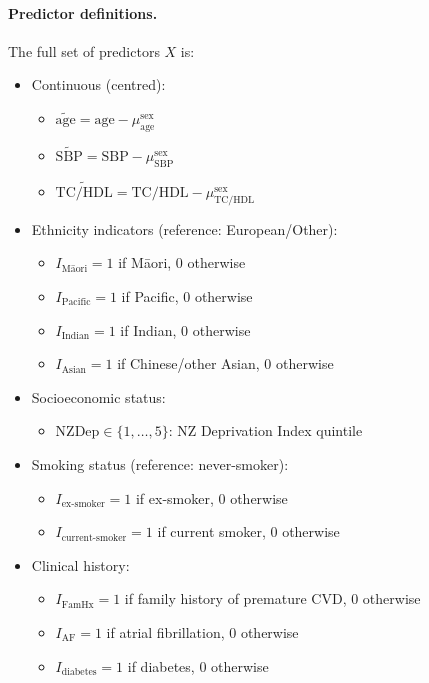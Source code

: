 \documentclass{article}
\begin{document}
\paragraph{Predictor definitions.}
The full set of predictors \(X\) is:
\begin{itemize}
  \item Continuous (centred):
    \begin{itemize}
      \item \(\tilde{\text{age}} = \text{age} - \mu_{\text{age}}^{\text{sex}}\)
      \item \(\widetilde{\text{SBP}} = \text{SBP} - \mu_{\text{SBP}}^{\text{sex}}\)
      \item \(\widetilde{\text{TC/HDL}} = \text{TC/HDL} - \mu_{\text{TC/HDL}}^{\text{sex}}\)
    \end{itemize}
  \item Ethnicity indicators (reference: European/Other):
    \begin{itemize}
      \item \(I_{\text{M\={a}ori}} = 1\) if M\={a}ori, 0 otherwise
      \item \(I_{\text{Pacific}} = 1\) if Pacific, 0 otherwise
      \item \(I_{\text{Indian}} = 1\) if Indian, 0 otherwise
      \item \(I_{\text{Asian}} = 1\) if Chinese/other Asian, 0 otherwise
    \end{itemize}
  \item Socioeconomic status:
    \begin{itemize}
      \item \(\text{NZDep} \in \{1,\dots,5\}\): NZ Deprivation Index quintile
    \end{itemize}
  \item Smoking status (reference: never-smoker):
    \begin{itemize}
      \item \(I_{\text{ex-smoker}} = 1\) if ex-smoker, 0 otherwise
      \item \(I_{\text{current-smoker}} = 1\) if current smoker, 0 otherwise
    \end{itemize}
  \item Clinical history:
    \begin{itemize}
      \item \(I_{\text{FamHx}} = 1\) if family history of premature CVD, 0 otherwise
      \item \(I_{\text{AF}} = 1\) if atrial fibrillation, 0 otherwise
      \item \(I_{\text{diabetes}} = 1\) if diabetes, 0 otherwise

\end{itemize}
\end{itemize}
\end{document}
